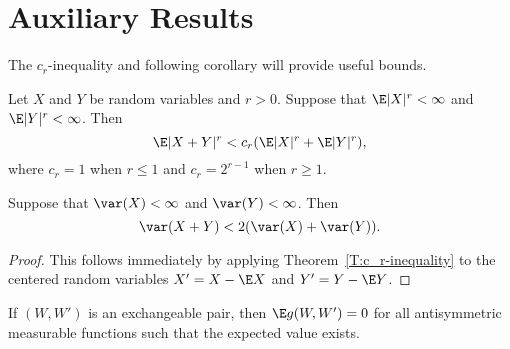 \chapter{Auxiliary Results}
\label{A:auxiliary-app}

The $c_r$-inequality and following corollary will provide useful
bounds.
\begin{theorem}
  \label{T:c_r-inequality}
  Let $X$ and $Y$ be random variables and $r > 0$.  Suppose that
  $\E|X|^r < \infty$ and $\E|Y|^r < \infty$.  Then
  \begin{equation}
    \E|X + Y|^r < c_r(\E|X|^r+\E|Y|^r),
  \end{equation}
  where $c_r = 1$ when $r \leq 1$ and $c_r = 2^{r-1}$ when $r \geq 1$.
\end{theorem}

\begin{corollary}
  \label{C:sum_variance}
  Suppose that $\var(X) < \infty$ and $\var(Y) < \infty$.  Then
  \begin{equation}
    \var(X + Y) < 2(\var(X)+\var(Y)).
  \end{equation}
\end{corollary}
\begin{proof}
  This follows immediately by applying Theorem~\ref{T:c_r-inequality}
  to the centered random variables $X' = X - \E X$ and $Y' = Y -
  \E Y$.
\end{proof}

\begin{lemma}
  \label{L:antisymmetric}
  If $(W, W')$ is an exchangeable pair, then $\E g(W, W') = 0$ for all antisymmetric
  measurable functions such that the expected value exists.
\end{lemma}

